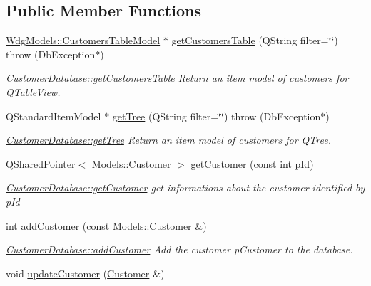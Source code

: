 \subsection*{Public Member Functions}
\begin{DoxyCompactItemize}
\item 
\hyperlink{classGui_1_1Widgets_1_1WdgModels_1_1CustomersTableModel}{Wdg\-Models\-::\-Customers\-Table\-Model} $\ast$ \hyperlink{classDatabases_1_1CustomerDatabase_a9c7ab43d4e219710604e030eb8ab44d8}{get\-Customers\-Table} (Q\-String filter=\char`\"{}\char`\"{})  throw (\-Db\-Exception$\ast$)
\begin{DoxyCompactList}\small\item\em \hyperlink{classDatabases_1_1CustomerDatabase_a9c7ab43d4e219710604e030eb8ab44d8}{Customer\-Database\-::get\-Customers\-Table} Return an item model of customers for Q\-Table\-View. \end{DoxyCompactList}\item 
Q\-Standard\-Item\-Model $\ast$ \hyperlink{classDatabases_1_1CustomerDatabase_ac611950b0502fbfe129ee1d1b495def4}{get\-Tree} (Q\-String filter=\char`\"{}\char`\"{})  throw (\-Db\-Exception$\ast$)
\begin{DoxyCompactList}\small\item\em \hyperlink{classDatabases_1_1CustomerDatabase_ac611950b0502fbfe129ee1d1b495def4}{Customer\-Database\-::get\-Tree} Return an item model of customers for Q\-Tree. \end{DoxyCompactList}\item 
Q\-Shared\-Pointer$<$ \hyperlink{classModels_1_1Customer}{Models\-::\-Customer} $>$ \hyperlink{classDatabases_1_1CustomerDatabase_ab0544439382fb6891cd7d27f67cb120c}{get\-Customer} (const int p\-Id)
\begin{DoxyCompactList}\small\item\em \hyperlink{classDatabases_1_1CustomerDatabase_ab0544439382fb6891cd7d27f67cb120c}{Customer\-Database\-::get\-Customer} get informations about the customer identified by {\itshape p\-Id} \end{DoxyCompactList}\item 
int \hyperlink{classDatabases_1_1CustomerDatabase_a0f45861747bcb0eef12f432dfe9be30e}{add\-Customer} (const \hyperlink{classModels_1_1Customer}{Models\-::\-Customer} \&)
\begin{DoxyCompactList}\small\item\em \hyperlink{classDatabases_1_1CustomerDatabase_a0f45861747bcb0eef12f432dfe9be30e}{Customer\-Database\-::add\-Customer} Add the customer {\itshape p\-Customer} to the database. \end{DoxyCompactList}\item 
\hypertarget{classDatabases_1_1CustomerDatabase_a83493698214a2e8e68024d007e715f35}{void \hyperlink{classDatabases_1_1CustomerDatabase_a83493698214a2e8e68024d007e715f35}{update\-Customer} (\hyperlink{classModels_1_1Customer}{Customer} \&)}\label{classDatabases_1_1CustomerDatabase_a83493698214a2e8e68024d007e715f35}


\end{DoxyCompactItemize}
